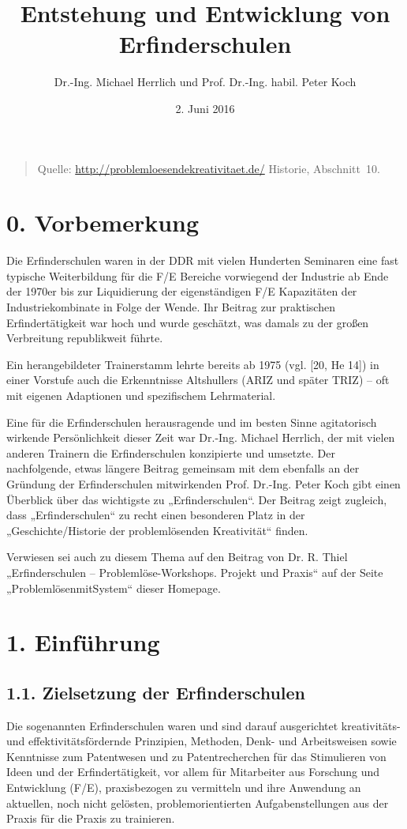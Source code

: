 \documentclass[11pt,a4paper]{article}
\title{Entstehung und Entwicklung von Erfinderschulen}
\author{Dr.-Ing. Michael Herrlich und Prof. Dr.-Ing. habil. Peter Koch}
\date{2. Juni 2016}
\begin{document}
\maketitle

\begin{quote}
  Quelle: \url{http://problemloesendekreativitaet.de/} Historie, Abschnitt~10.

\end{quote}

\section*{0. Vorbemerkung}

Die Erfinderschulen waren in der DDR mit vielen Hunderten Seminaren eine fast
typische Weiterbildung für die F/E Bereiche vorwiegend der Industrie ab Ende
der 1970er bis zur Liquidierung der eigenständigen F/E Kapazitäten der
Industriekombinate in Folge der Wende. Ihr Beitrag zur praktischen
Erfindertätigkeit war hoch und wurde geschätzt, was damals zu der großen
Verbreitung republikweit führte. 

Ein herangebildeter Trainerstamm lehrte bereits ab 1975 (vgl. [20, He 14]) in
einer Vorstufe auch die Erkenntnisse Altshullers (ARIZ und später TRIZ) – oft
mit eigenen Adaptionen und spezifischem Lehrmaterial.

Eine für die Erfinderschulen herausragende und im besten Sinne agitatorisch
wirkende Per\-sön\-lich\-keit dieser Zeit war Dr.-Ing. Michael Herrlich, der
mit vielen anderen Trainern die Erfinderschulen konzipierte und umsetzte. Der
nachfolgende, etwas längere Beitrag gemeinsam mit dem ebenfalls an der
Gründung der Erfinderschulen mitwirkenden Prof. Dr.-Ing. Peter Koch gibt einen
Überblick über das wichtigste zu „Erfinderschulen“. Der Beitrag zeigt
zugleich, dass „Erfinderschulen“ zu recht einen besonderen Platz in der
„Geschichte/Historie der problemlösenden Kreativität“ finden.

Verwiesen sei auch zu diesem Thema auf den Beitrag von Dr. R. Thiel
„Erfinderschulen -- Problemlöse-Workshops. Projekt und Praxis“ auf der Seite
„ProblemlösenmitSystem“ dieser Homepage.

\section*{1. Einführung}

\subsection*{1.1. Zielsetzung der Erfinderschulen}
Die sogenannten Erfinderschulen waren und sind darauf ausgerichtet
kreativitäts- und effektivitätsfördernde Prinzipien, Methoden, Denk- und
Arbeitsweisen sowie Kenntnisse zum Patentwesen und zu Patentrecherchen für
das Stimulieren von Ideen und der Erfindertätigkeit, vor allem für Mitarbeiter
aus Forschung und Entwicklung (F/E), praxisbezogen zu vermitteln und ihre
Anwendung an aktuellen, noch nicht gelösten, problemorientierten
Aufgabenstellungen aus der Praxis für die Praxis zu trainieren.
\end{document}
